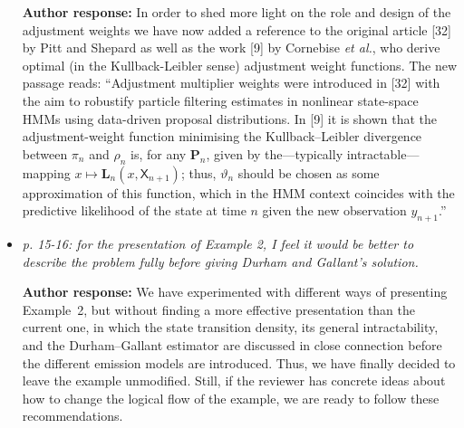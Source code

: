 \documentclass[11pt]{amsart}
\begin{document}
\begin{itemize}
\textbf{Author response:} In order to shed more light on the role and design of the adjustment weights we have now added a reference to the original article [32] by Pitt and Shepard as well as the work [9] by Cornebise \emph{et al.}, who derive optimal (in the Kullback-Leibler sense) adjustment weight functions. The new passage reads: ``Adjustment multiplier weights were introduced in [32] with the aim to robustify particle filtering estimates in nonlinear state-space HMMs using data-driven proposal distributions. In [9] it is shown that the adjustment-weight function minimising the Kullback--Leibler divergence between $\pi_n$ and $\rho_n$ is, for any $\mathbf{P}_n$, given by the---typically intractable---mapping $x \mapsto \mathbf{L}_n(x, \mathsf{X}_{n + 1})$; thus, $\vartheta_n$ should be chosen as some approximation of this function, which in the HMM context coincides with the predictive likelihood of the state at time $n$ given the new observation $y_{n + 1}$.'' \medskip


\item {\em p. 15-16: for the presentation of Example 2, I feel it would be better to describe the problem fully before giving Durham and Gallant's solution.} \medskip 

\textbf{Author response:} We have experimented with different ways of presenting Example~2, but without finding a more effective presentation than the current one, in which the state transition density, its general intractability, and the Durham--Gallant estimator are discussed in close connection before the different emission models are introduced. Thus, we have finally decided to leave the example unmodified. Still, if the reviewer has concrete ideas about how to change the logical flow of the example, we are ready to follow these recommendations. \medskip





\end{itemize}
\end{document}
